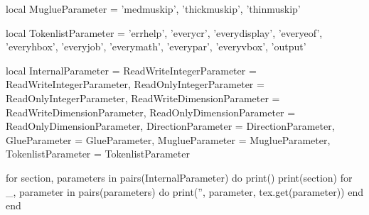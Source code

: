 {local MuglueParameter = {'medmuskip', 'thickmuskip', 'thinmuskip'}

local TokenlistParameter = {
    'errhelp', 'everycr', 'everydisplay', 'everyeof', 'everyhbox', 'everyjob',
    'everymath', 'everypar', 'everyvbox', 'output'
}

local InternalParameter = {
    ReadWriteIntegerParameter = ReadWriteIntegerParameter,
    ReadOnlyIntegerParameter = ReadOnlyIntegerParameter,
    ReadWriteDimensionParameter = ReadWriteDimensionParameter,
    ReadOnlyDimensionParameter = ReadOnlyDimensionParameter,
    DirectionParameter = DirectionParameter,
    GlueParameter = GlueParameter,
    MuglueParameter = MuglueParameter,
    TokenlistParameter = TokenlistParameter
}

for section, parameters in pairs(InternalParameter) do
    print()
    print(section)
    for _, parameter in pairs(parameters) do print('', parameter, tex.get(parameter)) end
end
}
\bye
